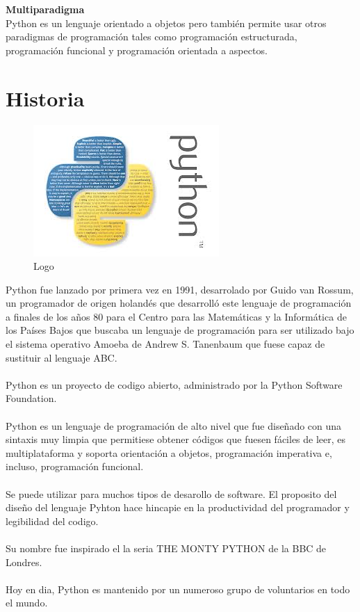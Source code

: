 \documentclass[11pt]{article} %
\begin{document}
\textbf{Multiparadigma}
\\   Python es un lenguaje orientado a objetos pero también permite usar otros paradigmas de programación tales como programación estructurada, programación funcional y programación orientada a aspectos.\\

\section{Historia}
\begin{figure}[htbp]
	\begin{center}
		\includegraphics[width=.60\textwidth]{./imagenes/python.png}
		\caption{Logo}
		\label{Logo}
	\end{center}
\end{figure}

Python fue lanzado por primera vez en 1991, desarrolado por Guido van Rossum, un programador de origen holandés que desarrolló este lenguaje de programación a finales de los años 80 para el Centro para las Matemáticas y la Informática de los Países Bajos que buscaba un lenguaje de programación para ser utilizado bajo el sistema operativo Amoeba de Andrew S. Tanenbaum que fuese capaz de sustituir al lenguaje ABC.
\\\\
Python es un proyecto de codigo abierto, administrado por la Python Software Foundation.
\\\\
Python es un lenguaje de programación de alto nivel que fue diseñado con una sintaxis muy limpia que permitiese obtener códigos que fuesen fáciles de leer, es multiplataforma y soporta orientación a objetos, programación imperativa e, incluso, programación funcional.
\\\\
Se puede utilizar para muchos tipos de desarollo de software. El proposito del diseño del lenguaje Pyhton hace hincapie en  la productividad del programador y legibilidad del codigo.
\\\\
Su nombre fue inspirado el la seria THE MONTY PYTHON de la BBC de Londres.
\\\\
Hoy en dia, Python es mantenido por un numeroso grupo de voluntarios en todo el mundo.
\end{document}

